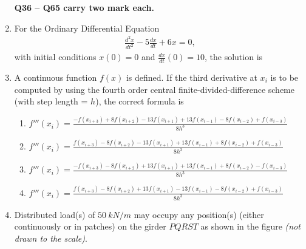 \documentclass[journal]{IEEEtran}
\begin{document}
\begin{enumerate}
\noindent \textbf{Q36 -- Q65 carry two mark each.}

\item For the Ordinary Differential Equation
\begin{align}
\frac{d^{2}x}{dt^{2}} - 5 \frac{dx}{dt} + 6x = 0,
\end{align}
with initial conditions $x(0)=0$ and $\frac{dx}{dt}(0)=10$, the solution is \hfill {}

\begin{enumerate}
\end{enumerate}

\item A continuous function $f(x)$ is defined. If the third derivative at $x_i$ is to be computed by using the fourth order central finite-divided-difference scheme (with step length = $h$), the correct formula is \hfill {}

\begin{enumerate}

\item $\displaystyle f'''(x_i) = \frac{-f(x_{i+3}) + 8f(x_{i+2}) - 13f(x_{i+1}) + 13f(x_{i-1}) - 8f(x_{i-2}) + f(x_{i-3})}{8h^{3}}$\\
\item $\displaystyle f'''(x_i) = \frac{f(x_{i+3}) - 8f(x_{i+2}) - 13f(x_{i+1}) + 13f(x_{i-1}) + 8f(x_{i-2}) + f(x_{i-3})}{8h^{3}}$\\
\item $\displaystyle f'''(x_i) = \frac{-f(x_{i+3}) - 8f(x_{i+2}) + 13f(x_{i+1}) + 13f(x_{i-1}) + 8f(x_{i-2}) - f(x_{i-3})}{8h^{3}}$\\
\item $\displaystyle f'''(x_i) = \frac{f(x_{i+3}) - 8f(x_{i+2}) + 13f(x_{i+1}) - 13f(x_{i-1}) - 8f(x_{i-2}) + f(x_{i-3})}{8h^{3}}$

\end{enumerate}

\item Distributed load(s) of $50 \ kN/m$ may occupy any position(s) (either continuously or in patches) on the girder $PQRST$ as shown in the figure \textit{(not drawn to the scale)}.  


\end{enumerate}
\end{document}
